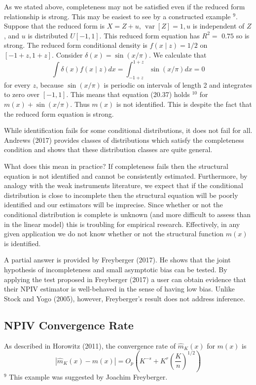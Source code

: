 \documentclass[10pt]{article}
\begin{document}
As we stated above, completeness may not be satisfied even if the reduced form relationship is strong. This may be easiest to see by a constructed example ${ }^{9}$. Suppose that the reduced form is $X=Z+u$, $\operatorname{var}[Z]=1, u$ is independent of $Z$, and $u$ is distributed $U[-1,1]$. This reduced form equation has $R^{2}=$ $0.75$ so is strong. The reduced form conditional density is $f(x \mid z)=1 / 2$ on $[-1+z, 1+z]$. Consider $\delta(x)=\sin (x / \pi)$. We calculate that
$$
\int \delta(x) f(x \mid z) d x=\int_{-1+z}^{1+z} \sin (x / \pi) d x=0
$$
for every $z$, because $\sin (x / \pi)$ is periodic on intervals of length 2 and integrates to zero over $[-1,1]$. This means that equation (20.37) holds ${ }^{10}$ for $m(x)+\sin (x / \pi)$. Thus $m(x)$ is not identified. This is despite the fact that the reduced form equation is strong.

While identification fails for some conditional distributions, it does not fail for all. Andrews (2017) provides classes of distributions which satisfy the completeness condition and shows that these distribution classes are quite general.

What does this mean in practice? If completeness fails then the structural equation is not identified and cannot be consistently estimated. Furthermore, by analogy with the weak instruments literature, we expect that if the conditional distribution is close to incomplete then the structural equation will be poorly identified and our estimators will be imprecise. Since whether or not the conditional distribution is complete is unknown (and more difficult to assess than in the linear model) this is troubling for empirical research. Effectively, in any given application we do not know whether or not the structural function $m(x)$ is identified.

A partial answer is provided by Freyberger (2017). He shows that the joint hypothesis of incompleteness and small asymptotic bias can be tested. By applying the test proposed in Freyberger (2017) a user can obtain evidence that their NPIV estimator is well-behaved in the sense of having low bias. Unlike Stock and Yogo (2005), however, Freyberger's result does not address inference.

\subsection{NPIV Convergence Rate}
As described in Horowitz (2011), the convergence rate of $\widehat{m}_{K}(x)$ for $m(x)$ is
$$
\left|\widehat{m}_{K}(x)-m(x)\right|=O_{p}\left(K^{-s}+K^{r}\left(\frac{K}{n}\right)^{1 / 2}\right)
$$
${ }^{9}$ This example was suggested by Joachim Freyberger.
\end{document}
